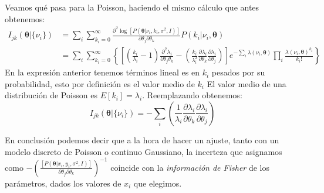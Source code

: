 \documentclass[aps,onecolumn,12pt,notitlepage]{revtex4-1}
\begin{document}
Veamos qué pasa para la Poisson, haciendo el mismo cálculo que antes obtenemos:
\begin{align}
I_{jk} (\boldsymbol{\theta}| \{\nu_{i}\}) &= \sum_{i} \sum_{k_{i} = 0}^{\infty} \frac{ \partial^{2}\log \left[ P \left(\boldsymbol{\theta} | \nu_{i},k_{i} ,\sigma^{2},I \right)\right] }{ \partial \theta_{j} \partial \theta_{k}}  P( k_{i}| \nu_{i} ,\boldsymbol{\theta} )  \\
&= \sum_{i} \sum_{k_{i}= 0}^{\infty}\left\{ \left[ \left( \frac{k_{i}}{\lambda_{i}} -1\right) \frac{\partial^{2} \lambda_{i}}{\partial \theta_{j} \theta_{k}} - \left(\frac{k_{i}}{\lambda^{2}_{i}}\frac{\partial \lambda_{i}}{\partial \theta_{k}}\frac{\partial \lambda_{i}}{\partial \theta_{j}}  \right)\right] e^{-\sum_{i} \lambda\left( \nu_{i},\boldsymbol{\theta}\right)} \prod_{i}\frac{\lambda\left(\nu_{i},\boldsymbol{\theta}\right)^{k_{i}}}{k_{i}!} \right \}
\end{align}
En la expresión anterior tenemos términos lineal es en $k_{i}$ pesados por su probabilidad, esto por definición es el valor medio de $k_{i}$ El valor medio de una distribución de Poisson es $E[k_{i}] = \lambda_{i}$. Reemplazando obtenemos:
\begin{equation}
I_{jk} (\boldsymbol{\theta}| \{\nu_{i}\}) = -\sum_{i} \left(\frac{1}{\lambda_{i}} \frac{\partial \lambda_{i}}{\partial \theta_{k}}\frac{\partial \lambda_{i}}{\partial \theta_{j}}\right)
\end{equation}

En conclusión podemos decir que a la hora de hacer un ajuste, tanto con un modelo discreto de Poisson o continuo Gaussiano, la incerteza que asignamos como $-\left(\frac{\left[P\left(\boldsymbol{\theta} | x_{i},y_{i} ,\sigma^{2},I \right)\right]}{ \partial \theta_{j} \partial \theta_{k}}\right)^{-1}$ coincide con la \textit{información de Fisher} de los parámetros, dados los valores de $x_{i}$ que elegimos.
\end{document}
